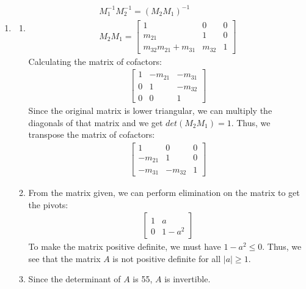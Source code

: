 \documentclass{article}
\begin{document}
\begin{enumerate}
    \item 
    \begin{enumerate}
        \item 
        \begin{gather*}
            M_1^{-1}M_2^{-1} = (M_2 M_1)^{-1} \\
            M_2 M_1 = 
            \begin{bmatrix}
                1 & 0 & 0\\
                m_{21} & 1 & 0\\
                m_{32}m_{21}+m_{31} & m_{32} & 1
            \end{bmatrix}
        \end{gather*}
        Calculating the matrix of cofactors: 
        \begin{gather*}
            \begin{bmatrix}
                1 & -m_{21} & -m_{31}\\
                0 & 1 & -m_{32}\\
                0 & 0 & 1
            \end{bmatrix}
        \end{gather*}
        Since the original matrix is lower triangular, we can multiply the diagonals of that 
        matrix and we get $det(M_2 M_1) = 1$. Thus, we transpose the matrix of cofactors: 
        \begin{gather*}
            \begin{bmatrix}
                1 & 0 & 0\\
                -m_{21} & 1 & 0\\
                -m_{31} & -m_{32} & 1
            \end{bmatrix}
        \end{gather*}

        \item From the matrix given, we can perform elimination on the matrix to 
        get the pivots: 
        \begin{gather*}
            \begin{bmatrix}
                1 & a\\
                0 & 1-a^2
            \end{bmatrix}
        \end{gather*}
        To make the matrix positive definite, we must have $1-a^2 \leq 0$. Thus, we see
        that the matrix $A$ is not positive definite for all $|a| \geq 1$. 

        \item Since the determinant of $A$ is 55, $A$ is invertible. 


\end{enumerate}
\end{enumerate}
\end{document}
